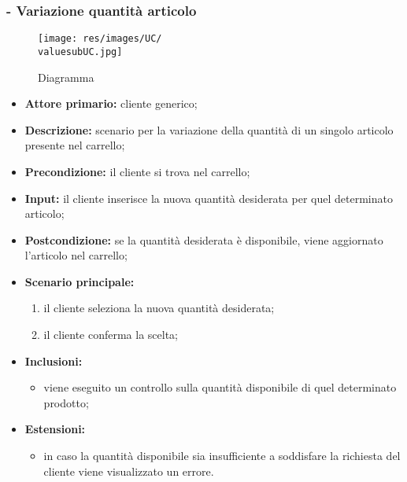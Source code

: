 \subsubsection{ - Variazione quantità articolo}
\begin{figure}[H]
    \centering
    \texttt{[image: res/images/UC/\\valuesubUC.jpg]}
    \caption{Diagramma }
\end{figure}
\begin{itemize}
    \item \textbf{Attore primario:} cliente generico;
    \item \textbf{Descrizione:} scenario per la variazione della quantità di un singolo articolo presente nel carrello;
    \item \textbf{Precondizione:} il cliente si trova nel carrello;
    \item \textbf{Input:} il cliente inserisce la nuova quantità desiderata per quel determinato articolo;
    \item \textbf{Postcondizione:} se la quantità desiderata è disponibile, viene aggiornato l'articolo nel carrello;
    \item \textbf{Scenario principale:}
          \begin{enumerate}
              \item il cliente seleziona la nuova quantità desiderata;
              \item il cliente conferma la scelta;
          \end{enumerate}
    \item \textbf{Inclusioni:}
          \begin{itemize}
              \item viene eseguito un controllo sulla quantità disponibile di quel determinato prodotto;
          \end{itemize}
    \item \textbf{Estensioni:}
          \begin{itemize}
              \item in caso la quantità disponibile sia insufficiente a soddisfare la richiesta del cliente viene visualizzato un errore.
          \end{itemize}
\end{itemize}

\stepsubUserCase
